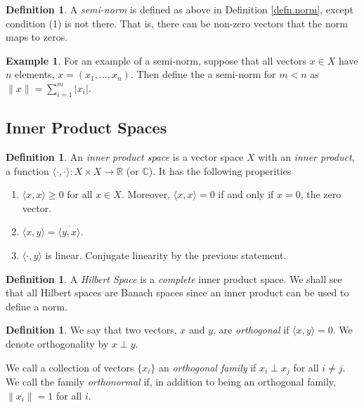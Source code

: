 \documentclass[12pt]{article}
\theoremstyle{plain}
\theoremstyle{definition}
\newtheorem{defn}[thm]{Definition}
\newtheorem{ex}[thm]{Example}
\theoremstyle{remark}
\begin{document}
\begin{defn}
A \emph{semi-norm} is defined as above in Definition \ref{defn.norm}, except condition (1) is not there. That is, there can be non-zero vectors that the norm maps to zeros.
\end{defn}
\begin{ex}
For an example of a semi-norm, suppose that all vectors $x\in X$ have $n$ elements, $x=(x_1,\ldots,x_n)$. Then define the a semi-norm for $m<n$ as $\lVert x\rVert = \sum_{i=1}^m |x_i|$.
\end{ex}

\subsection{Inner Product Spaces}

\begin{defn}
An \emph{inner product space} is a vector space $X$ with an \emph{inner product}, a function $\langle\cdot,\cdot\rangle:X\times X\rightarrow\mathbb{R}$ (or $\mathbb{C}$). It has the following properities
\begin{enumerate}
\item $\langle x,x\rangle \geq 0$ for all $x\in X$. Moreover, $\langle x,x\rangle=0$ if and only if $x=0$, the zero vector.
\item $\langle x,y\rangle= \overline{\langle y,x\rangle}$.
\item $\langle \cdot,y\rangle$ is linear. Conjugate linearity by the previous statement.
\end{enumerate}
\end{defn}

\begin{defn}
A \emph{Hilbert Space} is a \emph{complete} inner product space. We shall see that all Hilbert spaces are Banach spaces since an inner product can be used to define a norm.
\end{defn}

\begin{defn}
We say that two vectors, $x$ and $y$, are \emph{orthogonal} if $\langle x,y\rangle =0$. We denote orthogonality by $x\perp y$.

We call a collection of vectors $\{x_i\}$ an \emph{orthogonal family} if $x_i\perp x_j$ for all $i\neq j$. We call the family \emph{orthonormal} if, in addition to being an orthogonal family, $\lVert x_i\rVert=1$ for all $i$. 
\end{defn}
\end{document}
